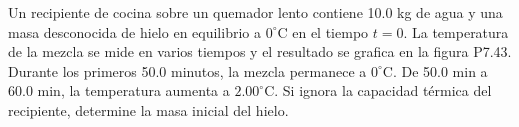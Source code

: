 \item Un recipiente de cocina sobre un quemador lento contiene 10.0 kg de agua y una masa desconocida de hielo en equilibrio a $0^\circ\text{C}$ en el tiempo $t = 0$. La temperatura de la mezcla se mide en varios tiempos y el resultado se grafica en la figura P7.43. Durante los primeros 50.0 minutos, la mezcla permanece a $0^\circ\text{C}$. De 50.0 min a 60.0 min, la temperatura aumenta a $2.00^\circ\text{C}$. Si ignora la capacidad térmica del recipiente, determine la masa inicial del hielo.
